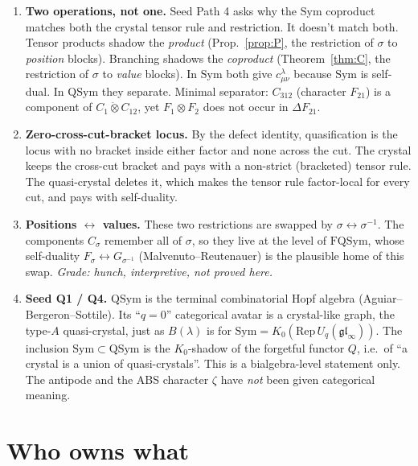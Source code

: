 \documentclass[11pt]{amsart}
\theoremstyle{definition}
\theoremstyle{remark}
\newcommand{\qt}{\mathbin{\ddot\otimes}}
\newcommand{\QSym}{\mathrm{QSym}}
\newcommand{\Sym}{\mathrm{Sym}}
\begin{document}
\begin{enumerate}[leftmargin=*]
\item \textbf{Two operations, not one.} Seed Path 4 asks why the $\Sym$ coproduct matches both the crystal tensor rule and restriction. It doesn't match both. Tensor products shadow the \emph{product} (Prop.~\ref{prop:P}, the restriction of $\sigma$ to \emph{position} blocks). Branching shadows the \emph{coproduct} (Theorem~\ref{thm:C}, the restriction of $\sigma$ to \emph{value} blocks). In $\Sym$ both give $c^\lambda_{\mu\nu}$ because $\Sym$ is self-dual. In $\QSym$ they separate. Minimal separator: $C_{312}$ (character $F_{21}$) is a component of $C_1\qt C_{12}$, yet $F_1\otimes F_2$ does not occur in $\Delta F_{21}$.
\item \textbf{Zero-cross-cut-bracket locus.} By the defect identity, quasification is the locus with no bracket inside either factor and none across the cut. The crystal keeps the cross-cut bracket and pays with a non-strict (bracketed) tensor rule. The quasi-crystal deletes it, which makes the tensor rule factor-local for every cut, and pays with self-duality.
\item \textbf{Positions $\leftrightarrow$ values.} These two restrictions are swapped by $\sigma\leftrightarrow\sigma^{-1}$. The components $C_\sigma$ remember all of $\sigma$, so they live at the level of $\mathrm{FQSym}$, whose self-duality $F_\sigma\leftrightarrow G_{\sigma^{-1}}$ (Malvenuto--Reutenauer) is the plausible home of this swap. \emph{Grade: hunch, interpretive, not proved here.}
\item \textbf{Seed Q1 / Q4.} $\QSym$ is the terminal combinatorial Hopf algebra (Aguiar--Bergeron--Sottile). Its ``$q=0$'' categorical avatar is a crystal-like graph, the type-$A$ quasi-crystal, just as $B(\lambda)$ is for $\Sym=K_0(\mathrm{Rep}\,U_q(\mathfrak{gl}_\infty))$. The inclusion $\Sym\subset\QSym$ is the $K_0$-shadow of the forgetful functor $Q$, i.e.\ of ``a crystal is a union of quasi-crystals''. This is a bialgebra-level statement only. The antipode and the ABS character $\zeta$ have \emph{not} been given categorical meaning.
\end{enumerate}

\section{Who owns what}\label{sec:owners}
\end{document}
